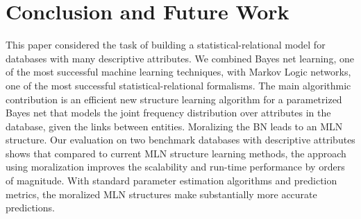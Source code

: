 \documentclass[letterpaper]{article}
\begin{document}
\section{Conclusion and Future Work}

This paper considered the task of building a statistical-relational model for databases with many descriptive attributes. We combined Bayes net learning, one of the most successful machine learning techniques, with Markov Logic networks, one of the most successful statistical-relational formalisms. The main algorithmic contribution is an efficient new structure learning algorithm for a parametrized Bayes net that models the joint frequency distribution over attributes in the database, given the links between entities. Moralizing the BN leads to an MLN structure. Our evaluation on two benchmark databases with descriptive attributes shows that compared to current MLN structure learning methods, the approach using moralization improves the scalability and run-time performance by orders of magnitude. With standard parameter estimation algorithms and prediction metrics, the moralized MLN structures make substantially more accurate predictions. 
\end{document}
